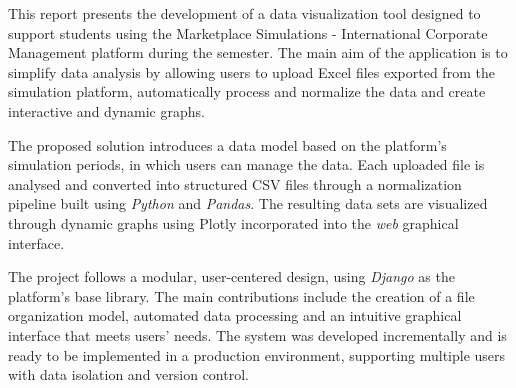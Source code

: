 This report presents the development of a data visualization tool designed to support students using the Marketplace Simulations - International Corporate Management platform during the semester. The main aim of the application is to simplify data analysis by allowing users to upload Excel files exported from the simulation platform, automatically process and normalize the data and create interactive and dynamic graphs.

The proposed solution introduces a data model based on the platform's simulation periods, in which users can manage the data. Each uploaded file is analysed and converted into structured CSV files through a normalization pipeline built using \textit{Python} and \textit{Pandas}. The resulting data sets are visualized through dynamic graphs using Plotly incorporated into the \textit{web} graphical interface.

The project follows a modular, user-centered design, using \textit{Django} as the platform's base library. The main contributions include the creation of a file organization model, automated data processing and an intuitive graphical interface that meets users' needs. The system was developed incrementally and is ready to be implemented in a production environment, supporting multiple users with data isolation and version control.